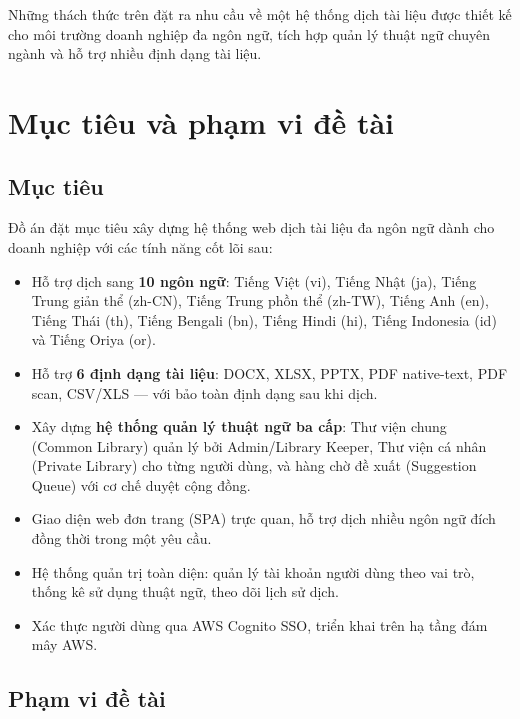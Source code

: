 Những thách thức trên đặt ra nhu cầu về một hệ thống dịch tài liệu được thiết kế cho môi
trường doanh nghiệp đa ngôn ngữ, tích hợp quản lý thuật ngữ chuyên ngành và hỗ trợ nhiều
định dạng tài liệu.

\section{Mục tiêu và phạm vi đề tài}

\subsection*{Mục tiêu}

Đồ án đặt mục tiêu xây dựng hệ thống web dịch tài liệu đa ngôn ngữ dành cho doanh nghiệp với
các tính năng cốt lõi sau:

\begin{itemize}
  \item Hỗ trợ dịch sang \textbf{10 ngôn ngữ}: Tiếng Việt (vi), Tiếng Nhật (ja), Tiếng Trung
    giản thể (zh-CN), Tiếng Trung phồn thể (zh-TW), Tiếng Anh (en), Tiếng Thái (th), Tiếng
    Bengali (bn), Tiếng Hindi (hi), Tiếng Indonesia (id) và Tiếng Oriya (or).

  \item Hỗ trợ \textbf{6 định dạng tài liệu}: DOCX, XLSX, PPTX, PDF native-text, PDF scan,
    CSV/XLS --- với bảo toàn định dạng sau khi dịch.

  \item Xây dựng \textbf{hệ thống quản lý thuật ngữ ba cấp}: Thư viện chung (Common Library)
    quản lý bởi Admin/Library Keeper, Thư viện cá nhân (Private Library) cho từng người dùng,
    và hàng chờ đề xuất (Suggestion Queue) với cơ chế duyệt cộng đồng.

  \item Giao diện web đơn trang (SPA) trực quan, hỗ trợ dịch nhiều ngôn ngữ đích đồng thời
    trong một yêu cầu.

  \item Hệ thống quản trị toàn diện: quản lý tài khoản người dùng theo vai trò, thống kê sử
    dụng thuật ngữ, theo dõi lịch sử dịch.

  \item Xác thực người dùng qua AWS Cognito SSO, triển khai trên hạ tầng đám mây AWS.
\end{itemize}

\subsection*{Phạm vi đề tài}

